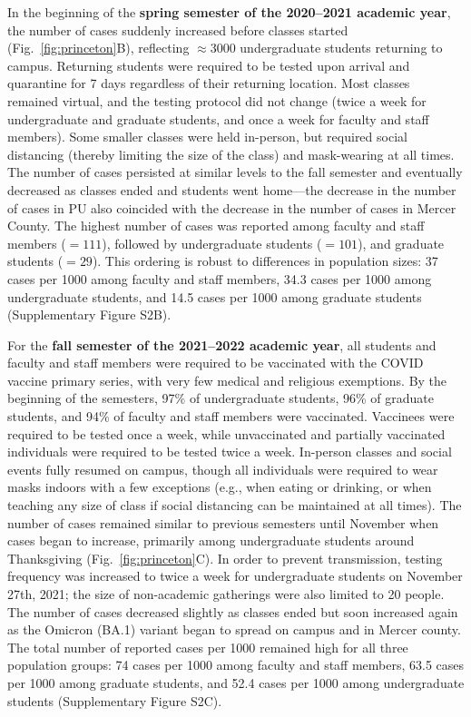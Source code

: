 \documentclass[12pt]{article}
\newcommand{\fref}[1]{Fig.~\ref{fig:#1}}
\begin{document}
In the beginning of the \textbf{spring semester of the 2020--2021 academic year}, the number of cases suddenly increased before classes started (\fref{princeton}B), reflecting $\approx 3000$ undergraduate students returning to campus.
Returning students were required to be tested upon arrival and quarantine for 7 days regardless of their returning location.
Most classes remained virtual, and the testing protocol did not change (twice a week for undergraduate and graduate students, and once a week for faculty and staff members).
Some smaller classes were held in-person, but required social distancing (thereby limiting the size of the class) and mask-wearing at all times.
The number of cases persisted at similar levels to the fall semester and eventually decreased as classes ended and students went home---the decrease in the number of cases in PU also coincided with the decrease in the number of cases in Mercer County.
The highest number of cases was reported among faculty and staff members ($=111$), followed by undergraduate students ($=101$), and graduate students ($=29$).
This ordering is robust to differences in population sizes: 37 cases per 1000 among faculty and staff members, 34.3 cases per 1000 among undergraduate students, and 14.5 cases per 1000 among graduate students (Supplementary Figure S2B).

For the \textbf{fall semester of the 2021--2022 academic year}, all students and faculty and staff members were required to be vaccinated with the COVID vaccine primary series, with very few medical and religious exemptions.
By the beginning of the semesters, 97\% of undergraduate students, 96\% of graduate students, and 94\% of faculty and staff members were vaccinated.
Vaccinees were required to be tested once a week, while unvaccinated and partially vaccinated individuals were required to be tested twice a week.
In-person classes and social events fully resumed on campus, though all individuals were required to wear masks indoors with a few exceptions (e.g., when eating or drinking, or when teaching any size of class if social distancing can be maintained at all times).
The number of cases remained similar to previous semesters until November when cases began to increase, primarily among undergraduate students around Thanksgiving (\fref{princeton}C).  
In order to prevent transmission, testing frequency was increased to twice a week for undergraduate students on November 27th, 2021; the size of non-academic gatherings were also limited to 20 people.
The number of cases decreased slightly as classes ended but soon increased again as the Omicron (BA.1) variant began to spread on campus and in Mercer county.
The total number of reported cases per 1000 remained high for all three population groups: 74 cases per 1000 among faculty and staff members, 63.5 cases per 1000 among graduate students, and 52.4 cases per 1000 among undergraduate students (Supplementary Figure S2C).
\end{document}
